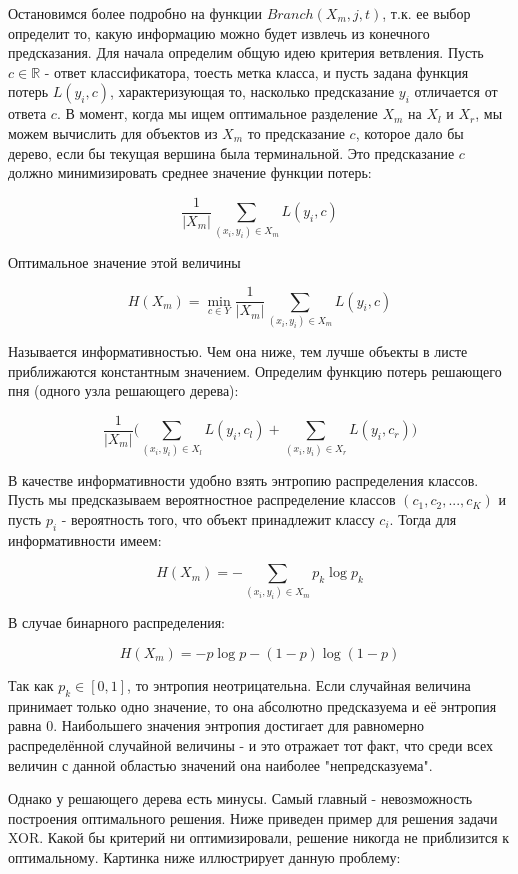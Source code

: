 Остановимся более подробно на функции $Branch(X_m, j, t)$, т.к. ее выбор определит то, какую информацию можно будет извлечь из конечного предсказания. Для начала определим общую идею критерия ветвления. Пусть $c \in \mathbb{R}$ - ответ классификатора, тоесть метка класса, и пусть задана функция потерь $L(y_i, c)$, характеризующая то, насколько предсказание $y_i$ отличается от ответа $c$. В момент, когда мы ищем оптимальное разделение $X_m$ на $X_l$ и $X_r$, мы можем вычислить для объектов из $X_m$ то предсказание $c$, которое дало бы дерево, если бы текущая вершина была терминальной. Это предсказание $c$ должно минимизировать среднее значение функции потерь:

\[ \dfrac{1}{|X_m|} \displaystyle\sum_{(x_i,y_i) \in X_m} L(y_i, c) \]

Оптимальное значение этой величины

\[ H(X_m) = \min_{c \in Y} \dfrac{1}{|X_m|} \displaystyle\sum_{(x_i,y_i) \in X_m} L(y_i, c) \]

Называется информативностью. Чем она ниже, тем лучше объекты в листе приближаются константным значением. Определим функцию потерь решающего пня (одного узла решающего дерева):

\[ \dfrac{1}{|X_m|} \lparen \displaystyle\sum_{(x_i,y_i) \in X_l} L(y_i, c_l) +  \displaystyle\sum_{(x_i,y_i) \in X_r} L(y_i, c_r) \rparen \]

В качестве информативности удобно взять энтропию распределения классов. Пусть мы предсказываем вероятностное распределение классов $(c_1, c_2, ..., c_K)$ и пусть $p_i$ - вероятность того, что объект принадлежит классу $c_i$. Тогда для информативности имеем\cite{SHAD-trees}:

\[ H(X_m) = - \displaystyle\sum_{(x_i,y_i) \in X_m} p_k \log{p_k} \]

В случае бинарного распределения:

\[ H(X_m) = - p \log{p} - (1 - p) \log{(1 - p)} \]

Так как $p_k \in [0,1]$, то энтропия неотрицательна. Если случайная величина принимает только одно значение, то она абсолютно предсказуема и её энтропия равна 0. Наибольшего значения энтропия достигает для равномерно распределённой случайной величины - и это отражает тот факт, что среди всех величин с данной областью значений она наиболее "непредсказуема".

Однако у решающего дерева есть минусы. Самый главный - невозможность построения оптимального решения. Ниже приведен пример для решения задачи XOR. Какой бы критерий ни оптимизировали, решение никогда не приблизится к оптимальному. Картинка ниже иллюстрирует данную проблему:

